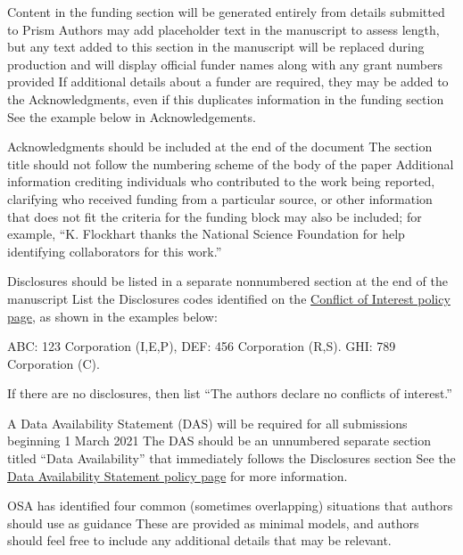 \documentclass{osa-article}
\begin{document}
\begin{backmatter}
Content in the funding section will be generated entirely from details submitted to Prism
Authors may add placeholder text in the manuscript to assess length, but any text added to this section in the manuscript will be replaced during production and will display official funder names along with any grant numbers provided
If additional details about a funder are required, they may be added to the Acknowledgments, even if this duplicates information in the funding section
See the example below in Acknowledgements.

Acknowledgments should be included at the end of the document
The section title should not follow the numbering scheme of the body of the paper
Additional information crediting individuals who contributed to the work being reported, clarifying who received funding from a particular source, or other information that does not fit the criteria for the funding block may also be included; for example, ``K. Flockhart thanks the National Science Foundation for help identifying collaborators for this work.''

Disclosures should be listed in a separate nonnumbered section at the end of the manuscript
List the Disclosures codes identified on the \href{https://opg.optica.org/submit/review/conflicts-interest-policy.cfm}{Conflict of Interest policy page}, as shown in the examples below:

\medskip

\noindent ABC: 123 Corporation (I,E,P), DEF: 456 Corporation (R,S). GHI: 789 Corporation (C).

\medskip

\noindent If there are no disclosures, then list ``The authors declare no conflicts of interest.''


A Data Availability Statement (DAS) will be required for all submissions beginning 1 March 2021
The DAS should be an unnumbered separate section titled ``Data Availability'' that
immediately follows the Disclosures section
See the \href{https://www.osapublishing.org/submit/review/data-availability-policy.cfm}{Data Availability Statement policy page} for more information.

OSA has identified four common (sometimes overlapping) situations that authors should use as guidance
These are provided as minimal models, and authors should feel free to
include any additional details that may be relevant.


\end{backmatter}
\end{document}
